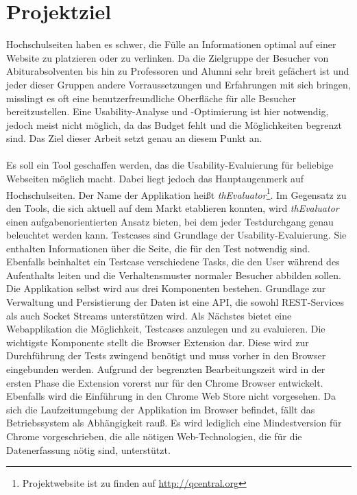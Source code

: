 %
%
%
%

\section{Projektziel}

Hochschulseiten haben es schwer, die Fülle an Informationen optimal auf einer Website zu platzieren oder zu verlinken. Da die Zielgruppe der Besucher von Abiturabsolventen bis hin zu Professoren und Alumni sehr breit gefächert ist und jeder dieser Gruppen andere Vorraussetzungen und Erfahrungen mit sich bringen, misslingt es oft eine benutzerfreundliche Oberfläche für alle Besucher bereitzustellen. Eine Usability-Analyse und -Optimierung ist hier notwendig, jedoch meist nicht möglich, da das Budget fehlt und die Möglichkeiten begrenzt sind. Das Ziel dieser Arbeit setzt genau an diesem Punkt an.\\
\\
Es soll ein Tool geschaffen werden, das die Usability-Evaluierung für beliebige Webseiten möglich macht. Dabei liegt jedoch das Hauptaugenmerk auf Hochschulseiten. Der Name der Applikation heißt \textit{thEvaluator}\footnote{Projektwebsite ist zu finden auf \url{http://qcentral.org}}. Im Gegensatz zu den Tools, die sich aktuell auf dem Markt etablieren konnten, wird \textit{thEvaluator} einen aufgabenorientierten Ansatz bieten, bei dem jeder Testdurchgang genau beleuchtet werden kann. Testcases sind Grundlage der Usability-Evaluierung. Sie enthalten Informationen über die Seite, die für den Test notwendig sind. Ebenfalls beinhaltet ein Testcase verschiedene  Tasks, die den User während des Aufenthalts leiten und die Verhaltensmuster normaler Besucher abbilden sollen. Die Applikation selbst wird aus drei Komponenten bestehen. Grundlage zur Verwaltung und Persistierung der Daten ist eine API, die sowohl REST-Services als auch Socket Streams unterstützen wird. Als Nächstes bietet eine Webapplikation die Möglichkeit, Testcases anzulegen und zu evaluieren. Die wichtigste Komponente stellt die Browser Extension dar. Diese wird zur Durchführung der Tests zwingend benötigt und muss vorher in den Browser eingebunden werden. Aufgrund der begrenzten Bearbeitungszeit wird in der ersten Phase die Extension vorerst nur für den Chrome Browser entwickelt. Ebenfalls wird die Einführung in den Chrome Web Store nicht vorgesehen. Da sich die Laufzeitumgebung der Applikation im Browser befindet, fällt das Betriebssystem als Abhängigkeit rauß. Es wird lediglich eine Mindestversion für Chrome vorgeschrieben, die alle nötigen Web-Technologien, die für die Datenerfassung nötig sind, unterstützt.\\
